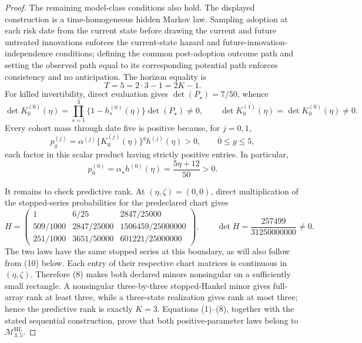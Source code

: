 \documentclass{article}
\begin{document}
\begin{proof}
The remaining model-class conditions also hold. The displayed construction is a time-homogeneous hidden Markov law. Sampling adoption at each risk date from the current state before drawing the current and future untreated innovations enforces the current-state hazard and future-innovation-independence conditions; defining the common post-adoption outcome path and setting the observed path equal to its corresponding potential path enforces consistency and no anticipation. The horizon equality is
\[
 T=5=2\cdot3-1=2K-1.                                         \tag{4}
\]
For killed invertibility, direct evaluation gives \(\det(P_{\star})=7/50\), whence
\[
 \det K_0^{(0)}(\eta)
 =\prod_{s=1}^3\{1-h_s^{(0)}(\eta)\}\det(P_{\star})\ne0,
 \qquad
 \det K_0^{(1)}(\eta)=\det K_0^{(0)}(\eta)\ne0.              \tag{5}
\]
Every cohort mass through date five is positive because, for \(j=0,1\),
\[
 p_g^{(j)}=\alpha^{(j)}\{K_0^{(j)}(\eta)\}^{g}h^{(j)}(\eta)>0,
 \qquad 0\le g\le5,                                          \tag{6}
\]
each factor in this scalar product having strictly positive entries. In particular,
\[
 p_0^{(0)}=\alpha_{\star}h^{(0)}(\eta)=\frac{5\eta+12}{50}>0. \tag{7}
\]

It remains to check predictive rank. At \((\eta,\zeta)=(0,0)\), direct multiplication of the stopped-series probabilities for the predeclared chart gives
\[
 H=
 \begin{pmatrix}
 1&6/25&2847/25000\\
 509/1000&2847/25000&1506459/25000000\\
 251/1000&3651/50000&601221/25000000
 \end{pmatrix},
 \qquad
 \det H=\frac{257499}{31250000000}\ne0.                      \tag{8}
\]
The two laws have the same stopped series at this boundary, as will also follow from (10) below. Each entry of their respective chart matrices is continuous in \((\eta,\zeta)\). Therefore (8) makes both declared minors nonsingular on a sufficiently small rectangle. A nonsingular three-by-three stopped-Hankel minor gives full-array rank at least three, while a three-state realization gives rank at most three; hence the predictive rank is exactly \(K=3\). Equations (1)--(8), together with the stated sequential construction, prove that both positive-parameter laws belong to \(\mathcal M^{\mathrm{HL}}_{3,5}\).


\end{proof}
\end{document}
